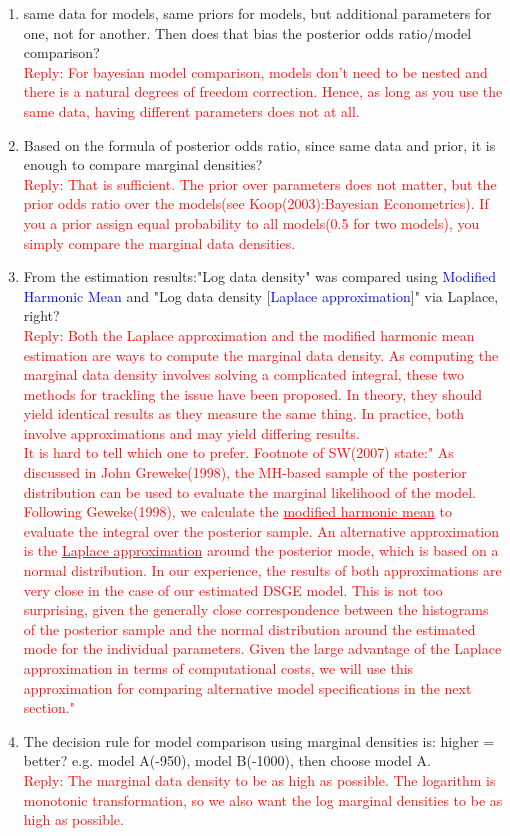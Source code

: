 \documentclass[10pt,math=newtx,citestyle=gb7714-2015,bibstyle=gb7714-2015]{elegantbook}
\begin{document}
{{{	\begin{enumerate}
		\item same data for models, same priors for models, but additional parameters for one, not for another. Then does that bias the posterior odds ratio/model comparison?\\
		\textcolor{red}{Reply: For bayesian model comparison, models don't need to be nested and there is a natural degrees of freedom correction. Hence, as long as you use the same data, having different parameters does not at all.}
		\item Based on the formula of posterior odds ratio, since same data and prior, it is enough to compare marginal densities?\\
		\textcolor{red}{Reply: That is sufficient. The prior over parameters does not matter, but the prior odds ratio over the models(see Koop(2003):Bayesian Econometrics). If you a prior assign equal probability to all models(0.5 for two models), you simply compare the marginal data densities.}
		\item From the estimation results:"Log data density" was compared using \textcolor{blue}{Modified Harmonic Mean} and "Log data density [\textcolor{blue}{Laplace approximation}]" via Laplace, right?\\
		\textcolor{red}{Reply: Both the Laplace approximation and the modified harmonic mean estimation are ways to compute the marginal data density. As computing the marginal data density involves solving a complicated integral, these two methods for trackling the issue have been proposed. In theory, they should yield identical results as they measure the same thing. In practice, both involve approximations and may yield differing results.\\
			It is hard to tell which one to prefer. Footnote of SW(2007) state:" As discussed in John Greweke(1998), the MH-based sample of the posterior distribution can be used to evaluate the marginal likelihood of the model. Following Geweke(1998), we calculate the \underline{modified harmonic mean} to evaluate the integral over the posterior sample. An alternative approximation is the \underline{Laplace approximation} around the posterior mode, which is based on a normal distribution. In our experience, the results of both approximations are very close in the case of our estimated DSGE model. This is not too surprising, given the generally close correspondence between the histograms of the posterior sample and the normal distribution around the estimated mode for the individual parameters. Given the large advantage of the Laplace approximation in terms of computational costs, we will use this approximation for comparing alternative model specifications in the next section."}
		\item The decision rule for model comparison using marginal densities is: higher = better? e.g. model A(-950), model B(-1000), then choose model A.\\
		\textcolor{red}{Reply: The marginal data density to be as high as possible. The logarithm is monotonic transformation, so we also want the log marginal densities to be as high as possible.}
		

\end{enumerate}}}}
\end{document}
